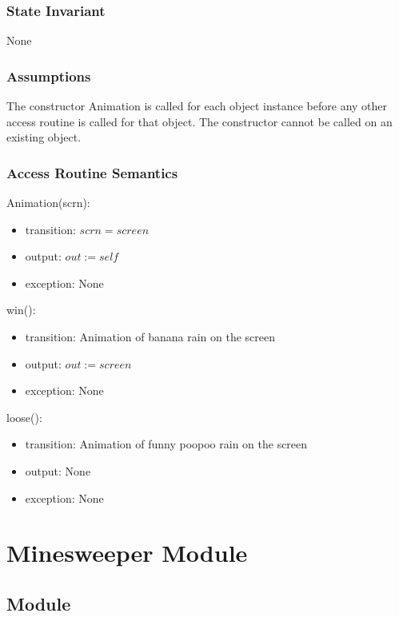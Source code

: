 \documentclass[12pt]{article}
\begin{document}
\subsubsection {State Invariant}

None

\subsubsection {Assumptions}

The constructor Animation is called for each object instance before any other
access routine is called for that object.  The constructor cannot be called on
an existing object.

\subsubsection {Access Routine Semantics}

Animation(scrn):
\begin{itemize}
\item transition: $scrn = screen$
\item output: $out := \mathit{self}$
\item exception: None
\end{itemize}

\noindent win():
\begin{itemize}
\item transition: Animation of banana rain on the screen
\item output: $out:=screen$
\item exception: None
\end{itemize}

\noindent loose():
\begin{itemize}
\item transition: Animation of funny poopoo rain on the screen
\item output: None
\item exception: None
\end{itemize}

\newpage

\section {Minesweeper Module}

\subsection {Module}
\end{document}
